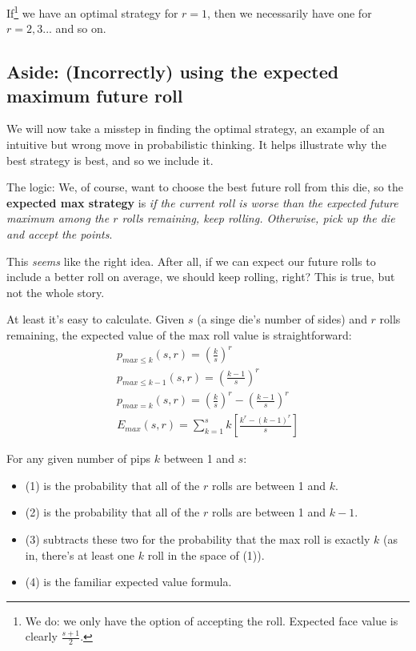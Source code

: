 \documentclass[11pt, oneside]{article} 	%
\begin{document}

If\footnote{We do: we only have the option of accepting the roll. Expected face value is clearly $\frac{s+1}{2}$.} we have an optimal strategy for $r=1$, then we necessarily have one for $r=2, 3... $ and so on.

\subsection{Aside: (Incorrectly) using the expected maximum future roll}

We will now take a misstep in finding the optimal strategy, an example of an intuitive but wrong move in probabilistic thinking. It helps illustrate why the best strategy is best, and so we include it.

The logic: We, of course, want to choose the best future roll from this die, so the \textbf{expected max strategy} is \emph{if the current roll is worse than the expected future maximum among the $r$ rolls remaining, keep rolling. Otherwise, pick up the die and accept the points}.

This \emph{seems} like the right idea. After all, if we can expect our future rolls to include a better roll on average, we should keep rolling, right?  This is true, but not the whole story. 

At least it's easy to calculate. Given $s$ (a singe die's number of sides) and $r$ rolls remaining, the expected value of the max roll value is straightforward:
\begin{align}
p_{max \leq k}(s,r) =  (\frac{k}{s})^r \\
p_{max \leq k-1}(s,r) =  (\frac{k-1}{s})^r \\
p_{max = k}(s,r) =  (\frac{k}{s})^r - (\frac{k-1}{s})^r \\
E_{max}(s,r) = \sum_{k=1}^s k[\frac{k^r - (k-1)^r}{s}]
\end{align}

For any given number of pips $k$ between 1 and $s$:
\begin{itemize}
\item (1) is the probability that all of the $r$ rolls are between 1 and $k$.
\item (2) is the probability that all of the $r$ rolls are between 1 and $k-1$.
\item (3) subtracts these two for the probability that the max roll is exactly $k$ (as in, there's at least one $k$ roll in the space of (1)).
\item (4) is the familiar expected value formula.
\end{itemize}
\end{document}
